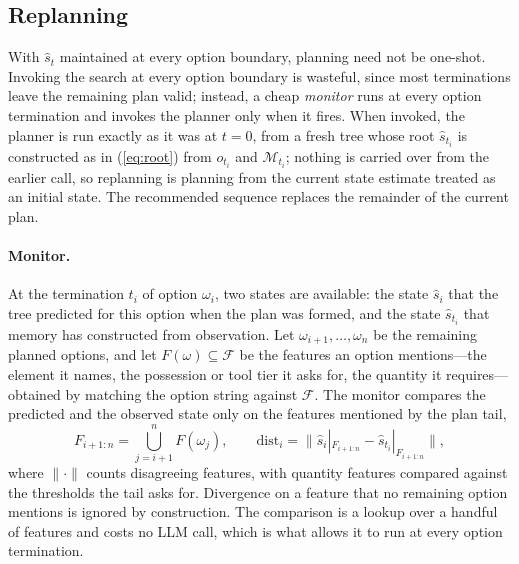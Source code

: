 \documentclass[11pt]{article}
\newcommand{\calF}{\mathcal{F}}
\newcommand{\calM}{\mathcal{M}}
\newcommand{\shat}{\hat{s}}
\newcommand{\dist}{\mathrm{dist}}
\begin{document}
\subsection{Replanning}
\label{sec:type1-replan}

With $\shat_t$ maintained at every option boundary, planning need not be one-shot. Invoking the search at every option boundary is wasteful, since most terminations leave the remaining plan valid; instead, a cheap \emph{monitor} runs at every option termination and invokes the planner only when it fires. When invoked, the planner is run exactly as it was at $t=0$, from a fresh tree whose root $\shat_{t_i}$ is constructed as in (\ref{eq:root}) from $o_{t_i}$ and $\calM_{t_i}$; nothing is carried over from the earlier call, so replanning is planning from the current state estimate treated as an initial state. The recommended sequence replaces the remainder of the current plan.

\paragraph{Monitor.}
At the termination $t_i$ of option $\omega_i$, two states are available: the state $\shat_i$ that the tree predicted for this option when the plan was formed, and the state $\shat_{t_i}$ that memory has constructed from observation. Let $\omega_{i+1},\dots,\omega_n$ be the remaining planned options, and let $F(\omega)\subseteq\calF$ be the features an option mentions---the element it names, the possession or tool tier it asks for, the quantity it requires---obtained by matching the option string against $\calF$. The monitor compares the predicted and the observed state only on the features mentioned by the plan tail,
\begin{equation}
F_{i+1:n}=\textstyle\bigcup_{j=i+1}^{n}F(\omega_j),\qquad
\dist_i=\big\|\shat_i|_{F_{i+1:n}}-\shat_{t_i}|_{F_{i+1:n}}\big\|,
\label{eq:monitor}
\end{equation}
where $\|\cdot\|$ counts disagreeing features, with quantity features compared against the thresholds the tail asks for. Divergence on a feature that no remaining option mentions is ignored by construction. The comparison is a lookup over a handful of features and costs no LLM call, which is what allows it to run at every option termination.
\end{document}
